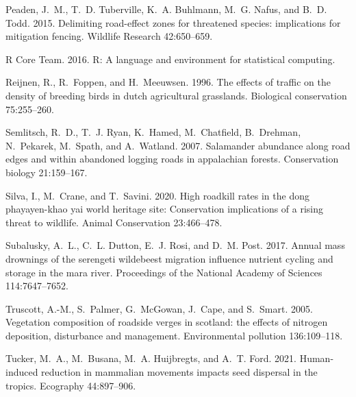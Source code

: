 \documentclass[11pt]{article}
\begin{document}
\begin{thebibliography}{40}
Peaden, J.~M., T.~D. Tuberville, K.~A. Buhlmann, M.~G. Nafus, and B.~D. Todd.
  2015.
\newblock Delimiting road-effect zones for threatened species: implications for
  mitigation fencing.
\newblock Wildlife Research 42:650--659.

{R Core Team}. 2016.
\newblock R: A language and environment for statistical computing.

Reijnen, R., R.~Foppen, and H.~Meeuwsen. 1996.
\newblock The effects of traffic on the density of breeding birds in dutch
  agricultural grasslands.
\newblock Biological conservation 75:255--260.

Semlitsch, R.~D., T.~J. Ryan, K.~Hamed, M.~Chatfield, B.~Drehman, N.~Pekarek,
  M.~Spath, and A.~Watland. 2007.
\newblock Salamander abundance along road edges and within abandoned logging
  roads in appalachian forests.
\newblock Conservation biology 21:159--167.

Silva, I., M.~Crane, and T.~Savini. 2020.
\newblock High roadkill rates in the dong phayayen-khao yai world heritage
  site: Conservation implications of a rising threat to wildlife.
\newblock Animal Conservation 23:466--478.

Subalusky, A.~L., C.~L. Dutton, E.~J. Rosi, and D.~M. Post. 2017.
\newblock Annual mass drownings of the serengeti wildebeest migration influence
  nutrient cycling and storage in the mara river.
\newblock Proceedings of the National Academy of Sciences 114:7647--7652.

Truscott, A.-M., S.~Palmer, G.~McGowan, J.~Cape, and S.~Smart. 2005.
\newblock Vegetation composition of roadside verges in scotland: the effects of
  nitrogen deposition, disturbance and management.
\newblock Environmental pollution 136:109--118.

Tucker, M.~A., M.~Busana, M.~A. Huijbregts, and A.~T. Ford. 2021.
\newblock Human-induced reduction in mammalian movements impacts seed dispersal
  in the tropics.
\newblock Ecography 44:897--906.


\end{thebibliography}
\end{document}
